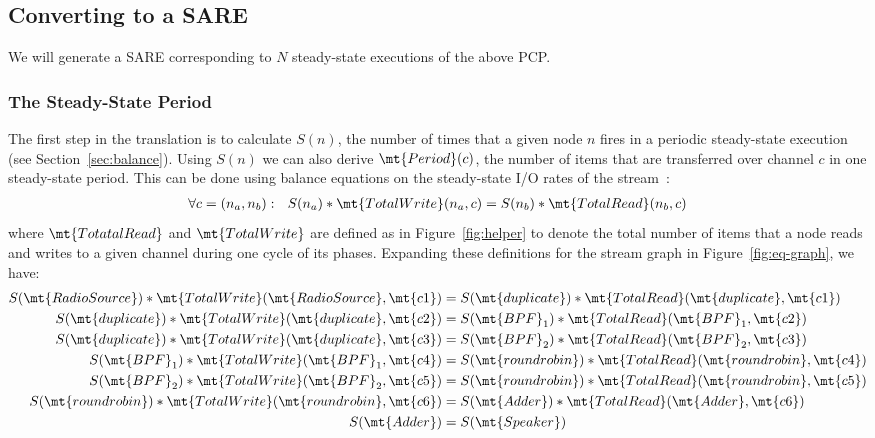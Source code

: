\subsection{Converting to a SARE}

We will generate a SARE corresponding to $N$ steady-state executions
of the above PCP.

\subsubsection{The Steady-State Period}

The first step in the translation is to calculate $S(n)$, the number
of times that a given node $n$ fires in a periodic steady-state
execution (see Section~\ref{sec:balance}).  Using $S(n)$ we can also
derive $\mt{Period}(c)$, the number of items that are transferred over
channel $c$ in one steady-state period.  This can be done using
balance equations on the steady-state I/O rates of the
stream~\cite{leesdf}:
\begin{align*}
\forall c = (n_a, n_b):~~S(n_a) * \mt{TotalWrite}(n_a, c) 
  = S(n_b) * \mt{TotalRead}(n_b, c)
\end{align*}
where $\mt{TotatalRead}$ and $\mt{TotalWrite}$ are defined as in
Figure~\ref{fig:helper} to denote the total number of items that a
node reads and writes to a given channel during one cycle of its
phases.  Expanding these definitions for the stream graph in
Figure~\ref{fig:eq-graph}, we have:
\begin{align*}
S(\mt{RadioSource}) * \mt{TotalWrite}(\mt{RadioSource}, \mt{c1}) 
  &= S(\mt{duplicate}) * \mt{TotalRead}(\mt{duplicate}, \mt{c1}) \\
S(\mt{duplicate}) * \mt{TotalWrite}(\mt{duplicate}, \mt{c2}) 
  &= S(\mt{BPF}_1) * \mt{TotalRead}(\mt{BPF}_1, \mt{c2}) \\
S(\mt{duplicate}) * \mt{TotalWrite}(\mt{duplicate}, \mt{c3})
  &= S(\mt{BPF}_2) * \mt{TotalRead}(\mt{BPF}_2, \mt{c3}) \\
S(\mt{BPF}_1) * \mt{TotalWrite}(\mt{BPF}_1, \mt{c4}) 
  &= S(\mt{roundrobin}) * \mt{TotalRead}(\mt{roundrobin}, \mt{c4}) \\
S(\mt{BPF}_2) * \mt{TotalWrite}(\mt{BPF}_2, \mt{c5}) 
  &= S(\mt{roundrobin}) * \mt{TotalRead}(\mt{roundrobin}, \mt{c5}) \\
S(\mt{roundrobin}) * \mt{TotalWrite}(\mt{roundrobin}, \mt{c6})
  &= S(\mt{Adder}) * \mt{TotalRead}(\mt{Adder}, \mt{c6}) \\
S(\mt{Adder}) 
  &= S(\mt{Speaker})
\end{align*}
